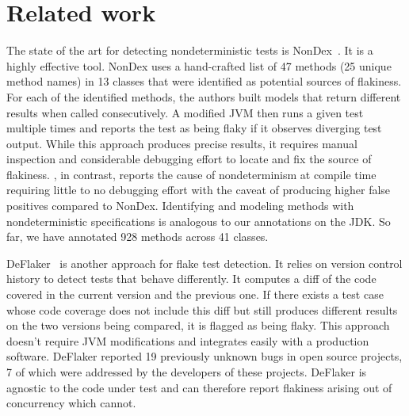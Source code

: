 \section{Related work}\label{sec:related}

The state of the art for detecting nondeterministic tests is NonDex~\cite{nondex}.  It is a highly effective tool.
NonDex uses a hand-crafted list of 47 methods (25 unique method names)
in 13 classes that were identified as potential sources of flakiness. 
For each of the identified methods, the authors built models that
return different results when called consecutively. A modified JVM then
runs a given test multiple times and reports the test as being flaky if it observes
diverging test output. While this approach produces precise results, it requires manual inspection
and considerable debugging effort to locate and fix the source of flakiness. \TheDeterminismChecker, in
contrast, reports the cause of nondeterminism at compile time requiring little to no debugging effort with the
caveat of producing higher false positives compared to NonDex. 
Identifying and modeling methods with nondeterministic
specifications is analogous to our annotations on the JDK\@. So far, we have annotated
928 methods across 41 classes.

DeFlaker~\cite{deflaker} is another approach for flake test detection. It relies on
version control history to detect tests that behave differently. It computes a diff of the code covered
in the current version and the previous one. If there exists a test case whose code coverage does not include
this diff but still produces different results on the two versions being compared, it is flagged as being flaky.
This approach doesn't require JVM modifications
and integrates easily with a production software. DeFlaker reported 19 previously unknown bugs
in open source projects, 7 of which were addressed by the developers of these projects. DeFlaker is agnostic
to the code under test and can therefore report flakiness arising out of concurrency which \TheDeterminismChecker cannot.

